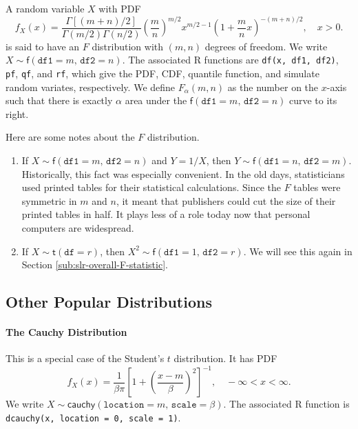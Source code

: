 \documentclass[captions=tableheading]{scrbook}
\begin{document}
A random variable \(X\) with PDF
\begin{equation}
f_{X}(x)=\frac{\Gamma[(m+n)/2]}{\Gamma(m/2)\Gamma(n/2)}\left(\frac{m}{n}\right)^{m/2}x^{m/2-1}\left(1+\frac{m}{n}x\right)^{-(m+n)/2},\quad x>0.
\end{equation}
is said to have an \(F\) distribution with \((m,n)\) degrees of freedom. We write \(X\sim\mathsf{f}(\mathtt{df1}=m,\,\mathtt{df2}=n)\). The associated \textsf{R} functions are \texttt{df(x, df1, df2)}, \texttt{pf}, \texttt{qf}, and \texttt{rf}, which give the PDF, CDF, quantile function, and simulate random variates, respectively. We define \(F_{\alpha}(m,n)\) as the number on the \(x\)-axis such that there is exactly \(\alpha\) area under the \(\mathsf{f}(\mathtt{df1}=m,\,\mathtt{df2}=n)\) curve to its right. 

\begin{rem}
Here are some notes about the \(F\) distribution.
\begin{enumerate}
\item If \(X\sim\mathsf{f}(\mathtt{df1}=m,\,\mathtt{df2}=n)\) and \(Y=1/X\), then \(Y\sim\mathsf{f}(\mathtt{df1}=n,\,\mathtt{df2}=m)\). Historically, this fact was especially convenient. In the old days, statisticians used printed tables for their statistical calculations. Since the \(F\) tables were symmetric in \(m\) and \(n\), it meant that publishers could cut the size of their printed tables in half. It plays less of a role today now that personal computers are widespread.
\item If \(X\sim\mathsf{t}(\mathtt{df}=r)\), then \(X^{2}\sim\mathsf{f}(\mathtt{df1}=1,\,\mathtt{df2}=r)\). We will see this again in Section \ref{sub:slr-overall-F-statistic}.
\end{enumerate}
\end{rem}
\subsection{Other Popular Distributions}
\label{sec-6-5-6}

\label{sub:Other-Popular-Distributions}

\paragraph*{The Cauchy Distribution}
\label{sub:The-Cauchy-Distribution}

This is a special case of the Student's \(t\) distribution. It has PDF
\begin{equation}
f_{X}(x)=\frac{1}{\beta\pi}\left[1+\left(\frac{x-m}{\beta}\right)^{2}\right]^{-1},\quad-\infty<x<\infty.
\end{equation}
We write \(X\sim\mathsf{cauchy}(\mathtt{location}=m,\,\mathtt{scale}=\beta)\). The associated \textsf{R} function is \texttt{dcauchy(x, location = 0, scale = 1)}.
\end{document}
